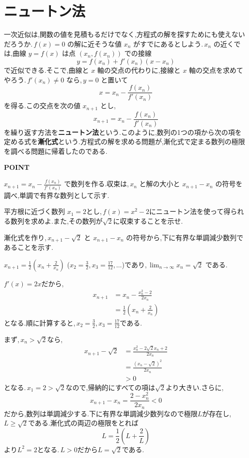 \section{ニュートン法}\label{節:ニュートン法}
一次近似は,関数の値を見積もるだけでなく,方程式の解を探すためにも使えないだろうか.\,$f(x)=0$ の解に近そうな値 $x_n$ がすでにあるとしよう.\,$x_n$ の近くでは,曲線 $y=f(x)$ は点 $(x_n,f(x_n))$ での接線
\[
 y=f(x_n)+f'(x_n)(x-x_n)
\]
で近似できる.そこで,曲線と $x$ 軸の交点の代わりに,接線と $x$ 軸の交点を求めてやろう.\,$f'(x_n)\ne0$ なら,\,$y=0$ と置いて
\[
 x=x_n-\frac{f(x_n)}{f'(x_n)}
\]
を得る.この交点を次の値 $x_{n+1}$ とし,
\[
 x_{n+1}=x_n-\frac{f(x_n)}{f'(x_n)}
\]
を繰り返す方法を\textbf{ニュートン法}という.このように,数列の1つの項から次の項を定める式を\textbf{漸化式}という.方程式の解を求める問題が,漸化式で定まる数列の極限を調べる問題に帰着したのである.

\begin{bookpoint}
\textbf{POINT}\par
$x_{n+1}=x_n-\frac{f(x_n)}{f'(x_n)}$ で数列を作る.収束は,\,$x_n$ と解の大小と $x_{n+1}-x_n$ の符号を調べ,単調で有界な数列として示す.
\end{bookpoint}

\begin{example}{平方根に近づく数列}
$x_1=2$とし,\,$f(x)=x^2-2$にニュートン法を使って得られる数列を求めよ.また,その数列が$\sqrt2$に収束することを示せ.
\end{example}
漸化式を作り,\,$x_{n+1}-\sqrt2$ と $x_{n+1}-x_n$ の符号から,下に有界な単調減少数列であることを示す.

$x_{n+1}=\frac12\left(x_n+\frac2{x_n}\right)$ ($x_2=\frac32$,\,$x_3=\frac{17}{12}$,\,$\ldots$)であり,\,$\lim_{n\to\infty}x_n=\sqrt2$ である.

$f'(x)=2x$だから,
\begin{align*}
 x_{n+1}&=x_n-\frac{x_n^2-2}{2x_n}\\
 &=\frac12\left(x_n+\frac2{x_n}\right)
\end{align*}
となる.順に計算すると,\,$x_2=\frac32$,\,$x_3=\frac{17}{12}$である.

まず,\,$x_n>\sqrt2$なら,
\begin{align*}
 x_{n+1}-\sqrt2
 &=\frac{x_n^2-2\sqrt2x_n+2}{2x_n}\\
 &=\frac{(x_n-\sqrt2)^2}{2x_n}\\
 &>0
\end{align*}
となる.\,$x_1=2>\sqrt2$なので,帰納的にすべての項は$\sqrt2$より大きい.さらに,
\[
 x_{n+1}-x_n=\frac{2-x_n^2}{2x_n}<0
\]
だから,数列は単調減少する.下に有界な単調減少数列なので極限$L$が存在し,\,$L\ge\sqrt2$である.漸化式の両辺の極限をとれば
\[
 L=\frac12\left(L+\frac2L\right)
\]
より$L^2=2$となる.\,$L>0$だから$L=\sqrt2$である.

